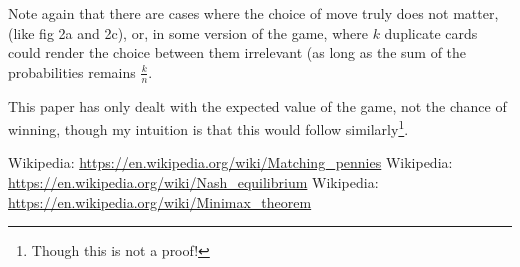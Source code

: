 \documentclass[11pt, oneside]{article} 	%
\begin{document}
Note again that there are cases where the choice of move truly does not matter, (like fig 2a and 2c), or, in some version of the game, where $k$ duplicate cards could render the choice between them irrelevant (as long as the sum of the probabilities remains $\frac{k}{n}$.

This paper has only dealt with the expected value of the game, not the chance of winning, though my intuition is that this would follow similarly\footnote{Though this is not a proof!}.


\begin{thebibliography}{9}
 Wikipedia: \url{https://en.wikipedia.org/wiki/Matching_pennies}
 Wikipedia: \url{https://en.wikipedia.org/wiki/Nash_equilibrium}
 Wikipedia: \url{https://en.wikipedia.org/wiki/Minimax_theorem}
\end{thebibliography}
\end{document}
